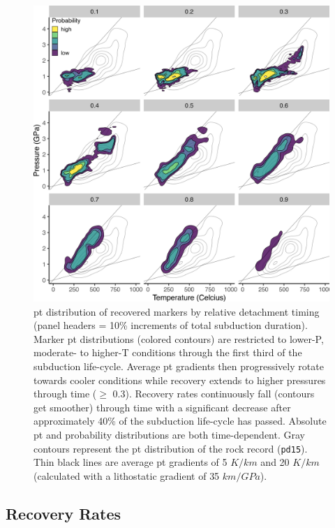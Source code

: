 \begin{figure}[htbp]

{\centering \includegraphics[width=1\linewidth,]{assets/figs/chpt4/detachDensity} 

}

\caption[Marker PT distribution by relative detachment timing]{\gls{pt} distribution of recovered markers by relative detachment timing (panel headers = 10\% increments of total subduction duration). Marker \gls{pt} distributions (colored contours) are restricted to lower-P, moderate- to higher-T conditions through the first third of the subduction life-cycle. Average \gls{pt} gradients then progressively rotate towards cooler conditions while recovery extends to higher pressures through time (\(\geq\) 0.3). Recovery rates continuously fall (contours get smoother) through time with a significant decrease after approximately 40\% of the subduction life-cycle has passed. Absolute \gls{pt} and probability distributions are both time-dependent. Gray contours represent the \gls{pt} distribution of the rock record (\texttt{pd15}). Thin black lines are average \gls{pt} gradients of 5 \(K/km\) and 20 \(K/km\) (calculated with a lithostatic gradient of 35 \(km/GPa\)).}\label{fig:detachDensity}
\end{figure}

\hypertarget{recovery-rates}{%
\subsection{Recovery Rates}\label{recovery-rates}}

